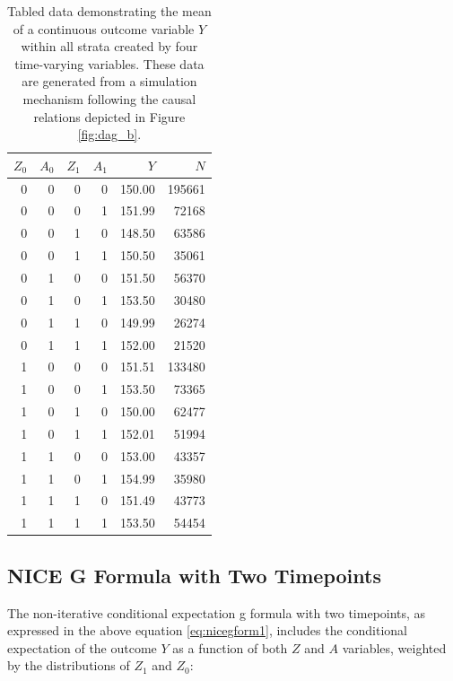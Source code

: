 \documentclass[12pt]{article}
\numberwithin{equation}{section}
\begin{document}
\begin{table}[ht]
\centering
\begin{tabular}{rrrrrr}
  \hline
 $Z_0$ & $A_0$ & $Z_1$ & $A_1$ & $Y$ & $N$ \\ 
  \hline
    0 &   0 &   0 &   0 & 150.00 & 195661 \\ 
    0 &   0 &   0 &   1 & 151.99 & 72168 \\ 
    0 &   0 &   1 &   0 & 148.50 & 63586 \\ 
    0 &   0 &   1 &   1 & 150.50 & 35061 \\ 
    0 &   1 &   0 &   0 & 151.50 & 56370 \\ 
    0 &   1 &   0 &   1 & 153.50 & 30480 \\ 
    0 &   1 &   1 &   0 & 149.99 & 26274 \\ 
    0 &   1 &   1 &   1 & 152.00 & 21520 \\ 
    1 &   0 &   0 &   0 & 151.51 & 133480 \\ 
     1 &   0 &   0 &   1 & 153.50 & 73365 \\ 
     1 &   0 &   1 &   0 & 150.00 & 62477 \\ 
     1 &   0 &   1 &   1 & 152.01 & 51994 \\ 
     1 &   1 &   0 &   0 & 153.00 & 43357 \\ 
     1 &   1 &   0 &   1 & 154.99 & 35980 \\ 
     1 &   1 &   1 &   0 & 151.49 & 43773 \\ 
     1 &   1 &   1 &   1 & 153.50 & 54454 \\ 
   \hline
\end{tabular}
\caption{Tabled data demonstrating the mean of a continuous outcome variable $Y$ within all strata created by four time-varying variables. These data are generated from a simulation mechanism following the causal relations depicted in Figure \ref{fig:dag_b}.}
\label{tab:time_varying_data}
\end{table}

\subsection{NICE G Formula with Two Timepoints}

The non-iterative conditional expectation g formula with two timepoints, as expressed in the above equation \ref{eq:nicegform1}, includes the conditional expectation of the outcome $Y$ as a function of both $Z$ and $A$ variables, weighted by the distributions of $Z_1$ and $Z_0$:
\end{document}
